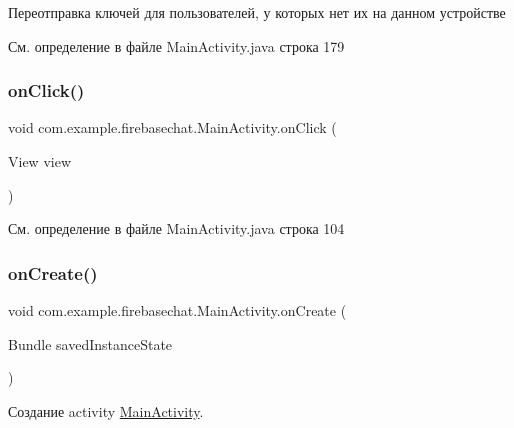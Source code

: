 Переотправка ключей для пользователей, у которых нет их на данном устройстве 



См. определение в файле Main\+Activity.\+java строка 179

\mbox{\label{classcom_1_1example_1_1firebasechat_1_1_main_activity_a859bd2e4eca1bcc5b64414f3fae8dfd5}} 
\subsubsection{\texorpdfstring{on\+Click()}{onClick()}}
{\footnotesize\ttfamily void com.\+example.\+firebasechat.\+Main\+Activity.\+on\+Click (\begin{DoxyParamCaption}\item[{View}]{view }\end{DoxyParamCaption})}



См. определение в файле Main\+Activity.\+java строка 104

\mbox{\label{classcom_1_1example_1_1firebasechat_1_1_main_activity_a65ecbc7b4bebeeee38c9e5ae03720412}} 
\subsubsection{\texorpdfstring{on\+Create()}{onCreate()}}
{\footnotesize\ttfamily void com.\+example.\+firebasechat.\+Main\+Activity.\+on\+Create (\begin{DoxyParamCaption}\item[{Bundle}]{saved\+Instance\+State }\end{DoxyParamCaption})\hspace{0.3cm}{\ttfamily [protected]}}



Создание activity \mbox{\hyperlink{classcom_1_1example_1_1firebasechat_1_1_main_activity}{Main\+Activity}}. 


